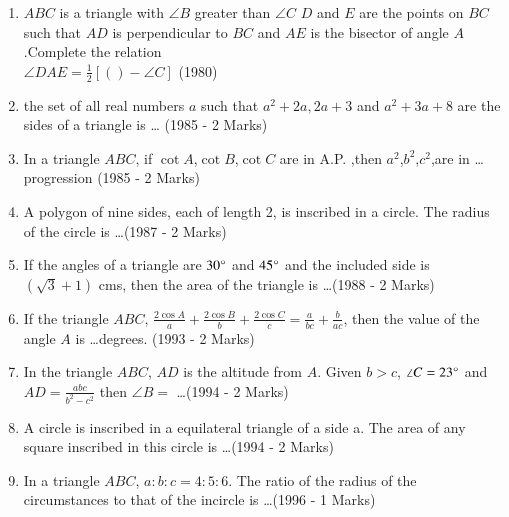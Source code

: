 \documentclass[journal,12pt,twocolumn]{IEEEtran}
\theoremstyle{remark}
\begin{document}
\begin{enumerate}
    \item $ABC$ is a triangle with $\angle B $ greater than $\angle C$ 
    $D$ and $E$ are the points on $BC$ such that $AD$ is perpendicular to $BC$ and $AE$ is the bisector of angle $A$ .Complete the relation\\
    $\angle DAE = \frac{1}{2} [( ) - \angle C]$
    \hfill (1980)
    \item the set of all real numbers $a$ such that $a^2 + 2a, 2a + 3$ and $a^2 + 3a + 8$ are the sides of a triangle is \dots
    \hfill (1985 - 2 Marks)
    \item In a triangle $ABC$, if $\cot A$,$\cot B$,$\cot C$ are in A.P. ,then $a^2$,$b^2$,$c^2$,are in \dots progression \hfill (1985 - 2 Marks)
    \item A polygon of nine sides, each of length 2, is inscribed in a circle. The radius of the circle is \dots \hfill (1987 - 2 Marks) 
    \item If the angles of a triangle are $30\degree$ and $45\degree$ and the included side is $(\sqrt{3} + 1)$ cms, then the area of the triangle is \dots \hfill (1988 - 2 Marks)
    \item If the triangle $ABC$, $\frac{2\cos A}{a} + \frac{2\cos B}{b} + \frac{2\cos C}{c} = \frac{a}{bc} +  \frac{b}{ac}$, then the value of the angle $A$ is \dots degrees. \hfil (1993 - 2 Marks)
    \item In the triangle $ABC$, $AD$ is the altitude from $A$. Given $b>c$, $\angle C=23 \degree$ and $AD = \frac{abc}{b^2 - c^2}$ then $\angle B = $ \dots \hfill (1994 - 2 Marks)
    \item A circle is inscribed in a equilateral triangle of a side a. The area of any square inscribed in this circle is \dots \hfill (1994 - 2 Marks)  
    \item In a triangle $ABC$, $a:b:c = 4:5:6$. The ratio of the radius of the circumstances to that of the incircle is \dots \hfill (1996 - 1 Marks) 
\end{enumerate}
\end{document}
